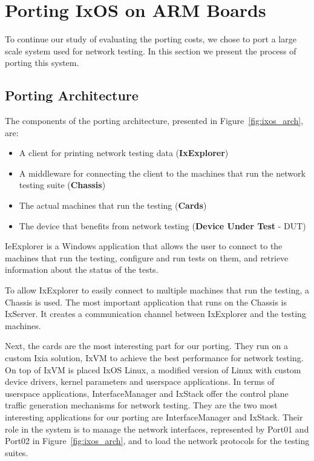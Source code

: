\chapter{Porting IxOS on ARM Boards} \label{sec:portingIxos}

To continue our study of evaluating the porting costs, we chose to port a large
scale system used for network testing. In this section we present the
process of porting this system. 

\section{Porting Architecture}

The components of the porting architecture, presented in
Figure~\ref{fig:ixos_arch}, are:
\begin{itemize}
    \item A client for printing network testing data (\textbf{IxExplorer})
    \item A middleware for connecting the client to the machines that run the
    network testing suite (\textbf{Chassis})
    \item The actual machines that run the testing (\textbf{Cards})
    \item The device that benefits from network testing (\textbf{Device Under Test} - DUT)
\end{itemize}

IeExplorer is a Windows application that allows the user to connect to the
machines that run the testing, configure and run tests on them, and retrieve
information about the status of the tests.

To allow IxExplorer to easily connect to multiple machines that run the testing,
a Chassis is used. The most important application that runs on the Chassis is
IxServer. It creates a communication channel between IxExplorer and the testing
machines.

Next, the cards are the most interesting part for our porting. They run on a
custom Ixia solution, IxVM to achieve the best performance for network testing.
On top of IxVM is placed IxOS Linux, a modified version of Linux with custom
device drivers, kernel parameters and userspace applications. In terms of
userspace applications, InterfaceManager and IxStack offer the control
plane traffic generation mechanisms for network testing. They are the two most
interesting applications for our porting are InterfaceManager and IxStack.
Their role in the system is to manage the network interfaces, represented by
Port01 and Port02 in Figure~\ref{fig:ixos_arch}, and to load the network
protocols for the testing suites.

